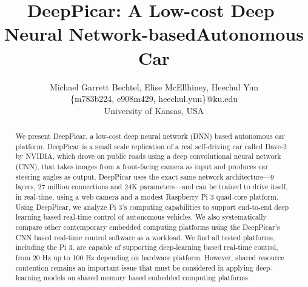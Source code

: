 \documentclass[10pt, conference]{IEEEtran}
\begin{document}
\title{DeepPicar:​ ​A​ ​Low-cost​ ​Deep​ ​Neural​ ​Network-based​ ​Autonomous​ ​Car}
\author{Michael Garrett Bechtel, Elise McEllhiney, Heechul Yun\\
\{m783b224, e908m429, heechul.yun\}@ku.edu\\
University of Kansas, USA\\ 
}

\maketitle
\thispagestyle{empty}
\begin{abstract}
We present DeepPicar, a low-cost deep neural network (DNN) based
autonomous car platform. DeepPicar is a small scale
replication of a real self-driving car called Dave-2 by NVIDIA, which
drove on public roads using a deep convolutional neural network (CNN), 
that takes images from a front-facing camera as input and produces
car steering angles as output. DeepPicar uses the exact same network
architecture---9 layers, 27 million connections and 24K
parameters---and can be trained to drive itself, in real-time, using a
web camera and a modest Raspberry Pi 3 quad-core platform.
Using DeepPicar, we analyze Pi 3's computing capabilities to 
support end-to-end deep learning based real-time control of autonomous
vehicles. We also systematically compare other contemporary embedded
computing platforms using the DeepPicar's CNN based real-time control
software as a workload. 
We find all tested platforms, including the Pi 3, are capable of
supporting deep-learning based real-time control, from 20 Hz up to 100
Hz depending on hardware platform. 
However, shared resource contention remains an
important issue that must be considered in applying deep-learning
models on shared memory based embedded computing platforms.
\end{abstract}






% 




\appendix

\end{document}
